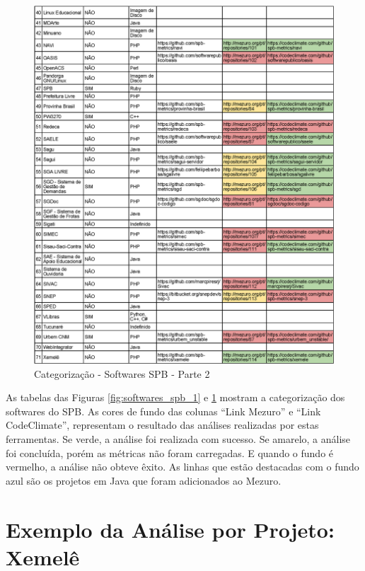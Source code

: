 \newpage


\begin{figure}[!htb]
	\centering
    \includegraphics[keepaspectratio=true,scale=0.85]
    {tabelas/spb_2_v2-crop.eps}
  \caption{Categorização - Softwares SPB - Parte 2}
  \label{fig:softwares_spb_2}
\end{figure}

\newpage

As tabelas das Figuras \ref{fig:softwares_spb_1} e \ref{fig:softwares_spb_2}
mostram a categorização dos softwares do SPB.
As cores de fundo das colunas ``Link Mezuro'' e ``Link CodeClimate'',
representam o resultado das análises realizadas por estas ferramentas. Se verde,
a análise foi realizada com sucesso. Se amarelo, a análise foi concluída, porém
as métricas não foram carregadas. E quando o fundo é vermelho, a análise não
obteve êxito. As linhas que estão destacadas com o fundo azul são os projetos em
Java que foram adicionados ao Mezuro.

\section{Exemplo da Análise por Projeto: Xemelê}

